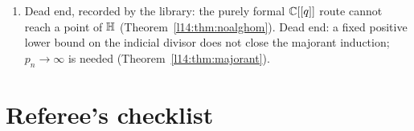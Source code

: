 \begin{enumerate}
  (, ); ``not connected to a VOA'' ();
   misnamed (); (C2) unbuilt and (C3) prerequisite
  contradiction ( vs );  ``not proved''
  ();  ``OPEN'' (); $\Vnat$ ``does
  not exist'' and $[q^2]j$ ``open'' ( and siblings) (all documentation only).
\item Dead end, recorded by the library: the purely formal ${\mathbb{C}}[[q]]$ route cannot reach a point of $\mathbb{H}$
  (Theorem~\ref{l14:thm:noalghom}). Dead end: a fixed positive lower bound on the indicial divisor does not close the majorant
  induction; $p_n\to\infty$ is needed (Theorem~\ref{l14:thm:majorant}).
\end{enumerate}

\section{Referee's checklist}\label{l14:sec:checklist}

